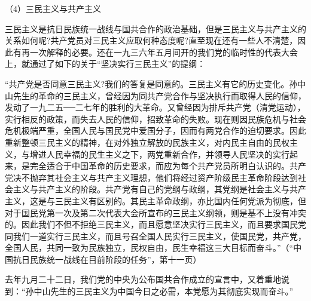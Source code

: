 \documentclass[UTF8, 12pt, a4paper]{ctexrep}
\begin{document}
（4）三民主义与共产主义

三民主义是抗日民族统一战线与国共合作的政治基础，但是三民主义与共产主义的关系如何呢?共产党员对三民主义应取何种态度呢?直至现在还有一些人不清楚，因此有再一次解释的必要。还在一九三六年五月间开的我们党的临时性的代表大会上，就通过了如下的关于“坚决实行三民主义”的提纲：

“共产党是否同意三民主义?我们的答复是同意的。三民主义有它的历史变化。孙中山先生的革命的三民主义，曾经因为同共产党合作与坚决执行而取得人民的信仰，发动了一九二五──二七年的胜利的大革命。又曾经因为排斥共产党（清党运动），实行相反的政策，而失去人民的信仰，招致革命的失败。现在则因民族危机与社会危机极端严重，全国人民与国民党中爱国分子，因而有两党合作的迫切要求。因此重新整顿三民主义的精神，在对外独立解放的民族主义，对内民主自由的民权主义，与增进人民幸福的民生主义之下，两党重新合作，并领导人民坚决的实行起来，是完全适合于中国革命的历史要求，而应为每个共产党员所明白认识的。共产党决不抛弃其社会主义与共产主义理想，他们将经过资产阶级民主革命阶段达到社会主义与共产主义的阶段。共产党有自己的党纲与政纲，其党纲是社会主义与共产主义，这是与三民主义有区别的。其民主革命政纲，亦比国内任何党派为彻底，但对于国民党第一次及第二次代表大会所宣布的三民主义纲领，则是基不上没有冲突的。因此我们不但不拒绝三民主义，而且愿意坚决实行三民主义，而且要求国民党同我们一道实行三民主义，而且号召全国人民实行三民主义，使国民党，共产党，全国人民，共同一致为民族独立，民权自由，民生幸福这三大目标而奋斗。”（“中国抗日民族统一战线在目前阶段的任务”，第十一页）

去年九月二十二日，我们党的中央为公布国共合作成立的宣言中，又着重地说到：“孙中山先生的三民主义为中国今日之必需，本党愿为其彻底实现而奋斗。”
\end{document}
